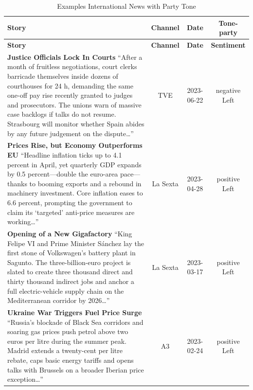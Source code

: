 \documentclass[12pt]{article}
\begin{document}
\begin{center}


\begin{longtable}{|p{8cm}|c|c|c|}
	\caption{Examples International News with Party Tone}\\
	\hline
	\textbf{Story} & \textbf{Channel} & \textbf{Date} & \textbf{Tone-party} \\
	\hline
	\endfirsthead
	\hline
	\textbf{Story} & \textbf{Channel} & \textbf{Date} & \textbf{Sentiment} \\
	\hline
	\endhead
	
	\textbf{Justice Officials Lock In Courts}\newline
	{\scriptsize“After a month of fruitless negotiations, court clerks barricade themselves inside dozens of courthouses for 24 h, demanding the same one-off pay rise recently granted to judges and prosecutors.  The unions warn of massive case backlogs if talks do not resume.  Strasbourg will monitor whether Spain abides by any future judgement on the dispute…”}
	& TVE & 2023-06-22 & negative Left\\
	\hline
	
	\textbf{Prices Rise, but Economy Outperforms EU}\newline
	{\scriptsize“Headline inflation ticks up to 4.1 percent in April, yet quarterly GDP expands by 0.5 percent—double the euro-area pace—thanks to booming exports and a rebound in machinery investment.  Core inflation eases to 6.6 percent, prompting the government to claim its ‘targeted’ anti-price measures are working…”}
	& La Sexta & 2023-04-28 & positive Left\\
	\hline
	
	\textbf{Opening of a New Gigafactory }\newline
	{\scriptsize“King Felipe VI and Prime Minister Sánchez lay the first stone of Volkswagen’s battery plant in Sagunto.  The three-billion-euro project is slated to create three thousand direct and thirty thousand indirect jobs and anchor a full electric-vehicle supply chain on the Mediterranean corridor by 2026…”}
	& La Sexta & 2023-03-17 & positive Left\\
	\hline
	
	\textbf{Ukraine War Triggers Fuel Price Surge}\newline
	{\scriptsize“Russia’s blockade of Black Sea corridors and soaring gas prices push petrol above two euros per litre during the summer peak.  Madrid extends a twenty-cent per litre rebate, caps basic energy tariffs and opens talks with Brussels on a broader Iberian price exception…”}
	& A3 & 2023-02-24 & positive Left\\
	\hline
	

\end{longtable}
\end{center}
\end{document}
